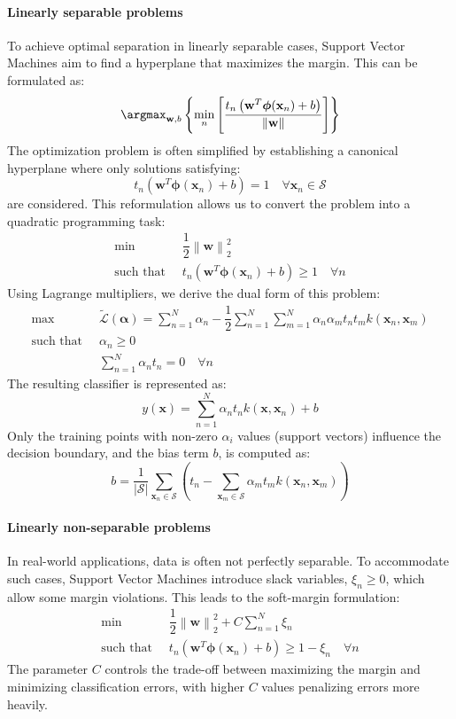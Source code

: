 \paragraph*{Linearly separable problems}
To achieve optimal separation in linearly separable cases, Support Vector Machines aim to find a hyperplane that maximizes the margin. 
This can be formulated as:
\[\argmax_{\mathbf{w},b}\left\{\min_n\left[\dfrac{t_n\left(\mathbf{w}^T\boldsymbol{\phi}(\mathbf{x}_n)+b\right)}{\left\lVert \mathbf{w}\right\rVert }\right]\right\}\]
The optimization problem is often simplified by establishing a canonical hyperplane where only solutions satisfying:
\[t_n\left(\mathbf{w}^T\boldsymbol{\phi}(\mathbf{x}_n)+b\right)=1\quad \forall\mathbf{x}_n\in\mathcal{S}\]
are considered. 
This reformulation allows us to convert the problem into a quadratic programming task:
\begin{align*}
    \min                      \:&\: \dfrac{1}{2}{\left\lVert \mathbf{w}\right\rVert}_2^2          \\
    \text{such that }           &\: t_n\left(\mathbf{w}^T\boldsymbol{\phi}(\mathbf{x}_n)+b\right)\geq 1 \quad\forall n        
\end{align*}  
Using Lagrange multipliers, we derive the dual form of this problem:
\begin{align*}
    \max                      \:&\: \tilde{\mathcal{L}}(\boldsymbol{\alpha})=\sum_{n=1}^N \alpha_n-\dfrac{1}{2}\sum_{n=1}^N\sum_{m=1}^N \alpha_n\alpha_m t_n t_m k(\mathbf{x}_n,\mathbf{x}_m)          \\
    \text{such that }           &\: \alpha_n\geq 0 \\
                                &\: \sum_{n=1}^{N}{\alpha_n t_n = 0} \quad \forall n
\end{align*}  
The resulting classifier is represented as:
\[y(\mathbf{x})=\sum_{n=1}^{N}\alpha_n t_n k(\mathbf{x},\mathbf{x}_n)+b\]
Only the training points with non-zero $\alpha_i$ values (support vectors) influence the decision boundary, and the bias term $b$, is computed as:
\[b=\dfrac{1}{\left\lvert \mathcal{S}\right\rvert }\sum_{\mathbf{x}_n\in\mathcal{S}} \left(t_n-\sum_{\mathbf{x}_m\in\mathcal{S}}\alpha_m t_m k(\mathbf{x}_n,\mathbf{x}_m)\right)\]

\paragraph*{Linearly non-separable problems}
In real-world applications, data is often not perfectly separable. 
To accommodate such cases, Support Vector Machines introduce slack variables, $\xi_n \geq 0$, which allow some margin violations. 
This leads to the soft-margin formulation:
\begin{align*}
    \min                      \:&\: \dfrac{1}{2}{\left\lVert \mathbf{w} \right\rVert}_2^2+C\sum_{n=1}^{N}\xi_n         \\
    \text{such that }           &\: t_n\left(\mathbf{w}^T\boldsymbol{\phi}(\mathbf{x}_n)+b\right) \geq 1-\xi_n \quad \forall n       
\end{align*}  
The parameter $C$ controls the trade-off between maximizing the margin and minimizing classification errors, with higher $C$ values penalizing errors more heavily.

